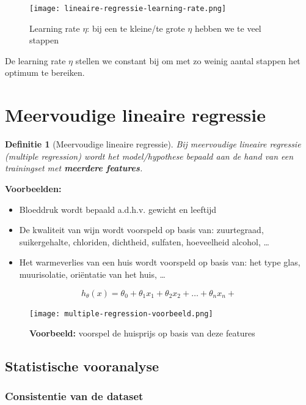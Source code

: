 \documentclass{article}
\newtheorem{theorem}{Definitie}[section]
\begin{document}
\begin{figure}[H]
    \centering
    \texttt{[image: lineaire-regressie-learning-rate.png]}
    \caption{Learning rate $\eta$: bij een te kleine/te grote $\eta$ hebben we te veel stappen}
\end{figure}

De learning rate $\eta$ stellen we constant bij om met zo weinig aantal stappen het optimum te bereiken.


\section{Meervoudige lineaire regressie}

\begin{theorem}[Meervoudige lineaire regressie]
Bij meervoudige lineaire regressie (multiple regression) wordt het model/hypothese bepaald 
aan de hand van een trainingset met \textbf{meerdere features}.
\end{theorem}

\textbf{Voorbeelden:}

\begin{itemize}
    \item Bloeddruk wordt bepaald a.d.h.v. gewicht en leeftijd
    \item De kwaliteit van wijn wordt voorspeld op basis van: zuurtegraad, suikergehalte, chloriden, dichtheid, sulfaten, hoeveelheid alcohol, \dots
    \item Het warmeverlies van een huis wordt voorspeld op basis van: het type glas, muurisolatie, oriëntatie van het huis, \dots
\end{itemize}

\begin{equation}
h_{\theta}(x) = \theta_0 + \theta_1x_1 + \theta_2x_2 + \dots + \theta_nx_n + 
\end{equation}

\begin{figure}[H]
    \centering
    \texttt{[image: multiple-regression-voorbeeld.png]}
    \caption{\textbf{Voorbeeld:} voorspel de huisprijs op basis van deze features }
\end{figure}

\subsection{Statistische vooranalyse}

\subsubsection{Consistentie van de dataset}
\end{document}
